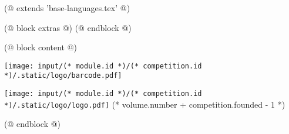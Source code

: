 (@ extends 'base-languages.tex' @)

(@ block extras @)
(@ endblock @)

(@ block content @)
    \pagestyle{empty}
    \begin{center}
        \null
        \vfill
        \texttt{[image: input/(* module.id *)/(* competition.id *)/.static/logo/barcode.pdf]}
    \end{center}
    \newpage
    \begin{center}
        \vspace*{20mm}
        \texttt{[image: input/(* module.id *)/(* competition.id *)/.static/logo/logo.pdf]}
        \vfill
        \fontsize{60}{25}\selectfont
        (* volume.number + competition.founded - 1 *)
    \end{center}
(@ endblock @)

